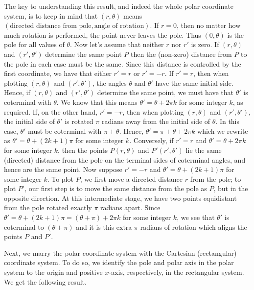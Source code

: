 The key to understanding this result, and indeed the whole polar coordinate system, is to keep in mind that  $(r,\theta)$ means $(\text{directed distance from pole}, \text{angle of rotation})$.  If $r = 0$, then no matter how much rotation is performed, the point never leaves the pole.  Thus $(0, \theta)$ is the pole for all values of $\theta$.  Now let's assume that neither $r$ nor $r'$ is zero.  If $\left(r, \theta\right)$ and $\left(r', \theta'\right)$ determine the same point $P$ then the (non-zero) distance from $P$ to the pole in each case must be the same.  Since this distance is controlled by the first coordinate, we have that either $r' = r$ or $r' = -r$.  If $r' = r$, then when plotting $\left(r, \theta\right)$ and $\left(r', \theta'\right)$, the angles $ \theta$ and $ \theta'$ have the same initial side.  Hence, if $\left(r, \theta\right)$ and $\left(r', \theta'\right)$ determine the same point,   we must have that $\theta'$  is coterminal with  $\theta$.  We know that this means $\theta' = \theta + 2\pi k$ for some integer $k$, as required.  If, on the other hand, $r' = -r$, then when plotting $\left(r, \theta\right)$ and $\left(r', \theta'\right)$, the initial side of $ \theta'$ is rotated $\pi$ radians away from the initial side of $\theta$.  In this case, $ \theta'$ must be coterminal with $\pi +  \theta$.  Hence, $ \theta' = \pi +  \theta + 2\pi k$ which we rewrite as $\theta' =  \theta + (2k+1)\pi$ for some integer $k$. Conversely, if $r' = r$ and $\theta' =  \theta + 2\pi k$ for some integer $k$, then  the points $P\left(r, \theta\right)$ and $P'\left(r', \theta'\right)$ lie the same (directed) distance from the pole on the terminal sides of coterminal angles, and hence are the same point.  Now suppose  $r' = -r$ and $\theta' = \theta + (2k + 1) \pi$ for some integer $k$.  To plot $P$, we first move a directed distance $r$ from the pole;  to plot $P'$, our first step is to move the same distance from the pole as $P$, but in the opposite direction.  At this intermediate stage, we have two points equidistant from the pole rotated exactly $\pi$ radians apart.  Since  $\theta' =  \theta + (2k + 1) \pi = \left(\theta + \pi\right) + 2\pi k $ for some integer $k$,  we see that $\theta'$ is coterminal to $\left(\theta + \pi\right)$ and it is this extra $\pi$ radians of rotation which aligns the points $P$ and $P'$.

\smallskip

Next, we marry the polar coordinate system with the Cartesian (rectangular) coordinate system.  To do so, we identify the pole and polar axis in the polar system to the origin and positive $x$-axis, respectively, in the rectangular system.  We get the following result.

